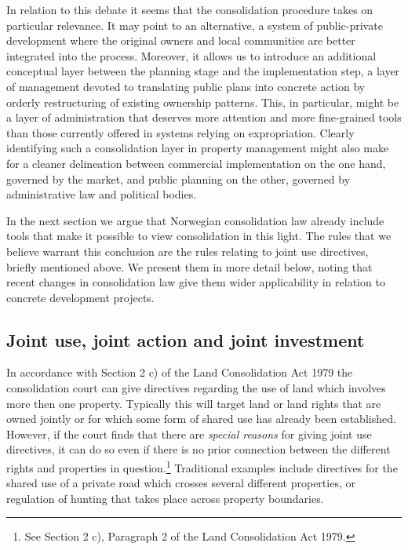 In relation to this debate it seems that the consolidation procedure takes on particular relevance. It may point to an alternative, a system of public-private development where the original owners and local communities are better integrated into the process. Moreover, it allows us to introduce an additional conceptual layer between the planning stage and the implementation step, a layer of management devoted to translating public plans into concrete action by orderly restructuring of existing ownership patterns. This, in particular, might be a layer of administration that deserves more attention and more fine-grained tools than those currently offered in systems relying on expropriation. Clearly identifying such a consolidation layer in property management might also make for a cleaner delineation between commercial implementation on the one hand, governed by the market, and public planning on the other, governed by administrative law and political bodies. 

In the next section we argue that Norwegian consolidation law already include tools that make it possible to view consolidation in this light. The rules that we believe warrant this conclusion are the rules relating to joint use directives, briefly mentioned above. We present them in more detail below, noting that recent changes in consolidation law give them wider applicability in relation to concrete development projects. 

\subsection{Joint use, joint action and joint investment}\label{sec:3}

In accordance with Section 2 c) of the Land Consolidation Act 1979 the consolidation court can give directives regarding the use of land which involves more then one property. Typically this will target land or land rights that are owned jointly or for which some form of shared use has already been established. However, if the court finds that there are \emph{special reasons} for giving joint use directives, it can do so even if there is no prior connection between the different rights and properties in question.\footnote{See Section 2 c), Paragraph 2 of the Land Consolidation Act 1979.} Traditional examples include directives for the shared use of a private road which crosses several different properties, or regulation of hunting that takes place across property boundaries.

